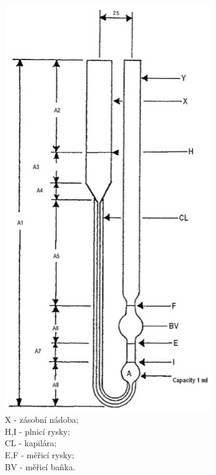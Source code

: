 \documentclass[12pt]{article}
\begin{document}
\begin{figure}
    \begin{subfigure}[b]{.3\textwidth}
        \captionsetup{justification=centering}
        \includegraphics[height=0.4\paperheight]{figures/ostwald.png}
        \caption{X - zásobní nádoba;\\H,I - plnicí rysky;\\CL - kapilára;\\E,F - měřicí rysky;\\BV - měřicí baňka.}
        \label{sfig:Ostwald_zpetny}
    \end{subfigure}
    \hfill
    \begin{subfigure}[b]{.3\textwidth}
        \captionsetup{justification=centering}

\end{subfigure}
\end{figure}
\end{document}

